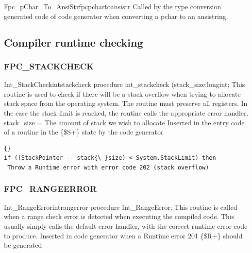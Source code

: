 \documentclass [a4paper,12pt]{article}
\begin{document}
\begin{functionl}{Fpc{\_}pChar{\_}To{\_}AnsiStr}{fpcpchartoansistr}
\Notes
Called by the type conversion generated code of code generator when
converting a pchar to an ansistring.
\end{functionl}

\ifpdf
 \clearpage
\fi

\subsection{Compiler runtime checking}
\label{subsec:compiler}

\subsubsection{FPC{\_}STACKCHECK}
\label{subsubsec:mylabel51}

\begin{procedurel}{Int{\_}StackCheck}{intstackcheck}
\Declaration
procedure int{\_}stackcheck (stack{\_}size:longint;
\Description
This routine is used to check if there will be a stack overflow when trying
to allocate stack space from the operating system. The routine must preserve
all registers. In the case the stack limit is reached, the routine calls the
appropriate error handler.
\Parameters
stack{\_}size = The amount of stack we wish to allocate
\Notes
Inserted in the entry code of a routine in the {\{}{\$}S+{\}} state by the code generator
\Algorithm
\begin{lstlisting}{}
if ((StackPointer -- stack{\_}size) < System.StackLimit) then
 Throw a Runtime error with error code 202 (stack overflow)
\end{lstlisting}
\end{procedurel}

\clearpage
\subsubsection{FPC{\_}RANGEERROR}
\label{subsubsec:mylabel52}

\begin{procedurel}{Int{\_}RangeError}{intrangerror}
\Declaration
procedure Int{\_}RangeError;
\Description
This routine is called when a range check error is detected when executing
the compiled code. This usually simply calls the default error handler, with
the correct runtime error code to produce.
\Parameters
Inserted in code generator when a Runtime error 201 {\{}{\$}R+{\}} should be
generated
\end{procedurel}
\end{document}
